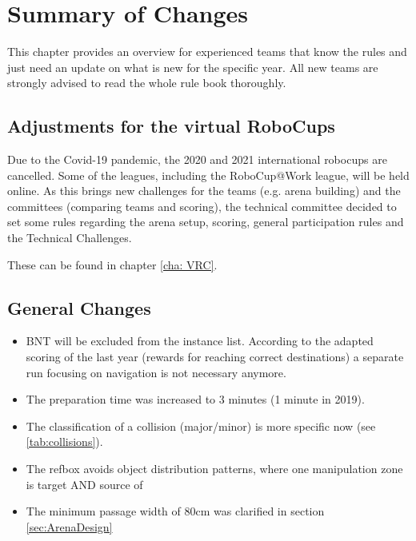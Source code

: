 
\chapter{Summary of Changes}

This chapter provides an overview for experienced teams that know the rules and just need an update on what is new for the specific year. 
All new teams are strongly advised to read the whole rule book thoroughly.

\section{Adjustments for the virtual RoboCups}

Due to the Covid-19 pandemic, the 2020 and 2021 international robocups are cancelled. 
Some of the leagues, including the RoboCup@Work league, will be held online.
As this brings new challenges for the teams (e.g. arena building) and the committees (comparing teams and scoring),
the technical committee decided to set some rules regarding the arena setup, scoring, general participation rules and the Technical Challenges.

These can be found in chapter \ref{cha: VRC}.  


\section{General Changes}
\begin{itemize}
  \item BNT will be excluded from the instance list. According to the adapted scoring of the last year (rewards for reaching correct destinations) a separate run focusing on navigation is not necessary anymore.
  \item The preparation time was increased to 3 minutes (1 minute in 2019).
  \item The classification of a collision (major/minor) is more specific now (see \ref{tab:collisions}).
  \item The refbox avoids object distribution patterns, where one manipulation zone is target AND source of
  \item The minimum passage width of 80cm was clarified in section \ref{sec:ArenaDesign}
\end{itemize}

